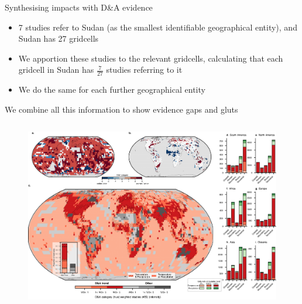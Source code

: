 \documentclass[9pt]{beamer}
\begin{document}
\begin{frame}{Synthesising impacts with D\&A evidence}
\begin{itemize}
\item 7 studies refer to Sudan (as the smallest identifiable geographical entity), and Sudan has 27 gridcells
\item We apportion these studies to the relevant gridcells, calculating that each gridcell in Sudan has $\frac{7}{27}$ studies referring to it
\item We do the same for each further geographical entity
\end{itemize}
\end{frame}

\begin{frame}{We combine all this information to show evidence gaps and gluts}

\begin{columns}
	\begin{column}{1\linewidth}
		\begin{figure}
			\includegraphics[width=\linewidth]{../figures/figure_2_CFS_10_28.png}
		\end{figure}
	\end{column}
\end{columns}

\end{frame}
\end{document}
